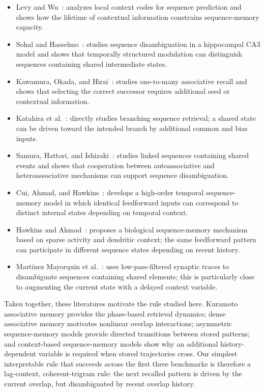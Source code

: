 \documentclass[11pt]{article}
\begin{document}
\begin{itemize}
\item Levy and Wu~\cite{levy1996context}: analyzes local context codes for sequence prediction and shows how the lifetime of contextual information constrains sequence-memory capacity.

\item Sohal and Hasselmo~\cite{sohal1998}: studies sequence disambiguation in a hippocampal CA3 model and shows that temporally structured modulation can distinguish sequences containing shared intermediate states.
\item Kawamura, Okada, and Hirai~\cite{kawamura1999selective}: studies one-to-many associative recall and shows that selecting the correct successor requires additional seed or contextual information.
\item Katahira et al.~\cite{katahira2007branching}: directly studies branching sequence retrieval; a shared state can be driven toward the intended branch by additional common and bias inputs.
\item Samura, Hattori, and Ishizaki~\cite{samura2008}: studies linked sequences containing shared events and shows that cooperation between autoassociative and heteroassociative mechanisms can support sequence disambiguation.
\item Cui, Ahmad, and Hawkins~\cite{cui2016}: develops a high-order temporal sequence-memory model in which identical feedforward inputs can correspond to distinct internal states depending on temporal context.
\item Hawkins and Ahmad~\cite{hawkins2016synapses}: proposes a biological sequence-memory mechanism based on sparse activity and dendritic context; the same feedforward pattern can participate in different sequence states depending on recent history.
\item Martinez Mayorquin et al.~\cite{martinez2019}: uses low-pass-filtered synaptic traces to disambiguate sequences containing shared elements; this is particularly close to augmenting the current state with a delayed context variable.

\end{itemize}

Taken together, these literatures motivate the rule studied here.  Kuramoto associative memory provides the phase-based retrieval dynamics; dense associative memory motivates nonlinear overlap interactions; asymmetric sequence-memory models provide directed transitions between stored patterns; and context-based sequence-memory models show why an additional history-dependent variable is required when stored trajectories cross.  Our simplest interpretable rule that succeeds across the first three benchmarks is therefore a lag-context, coherent-trigram rule: the next recalled pattern is driven by the current overlap, but disambiguated by recent overlap history.

\printbibliography
\end{document}
